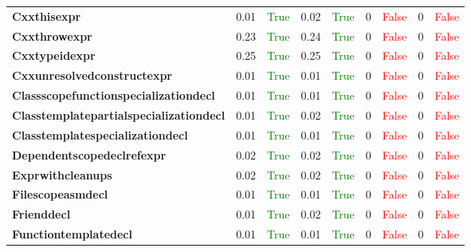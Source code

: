 \documentclass{article}
\begin{document}
\begin{xltabular}{\textwidth}{lcccccccc}
\textbf{{\fontsize{10}{12}\selectfont Cxxthisexpr}}& 0.01&\textcolor{green}{True}& 0.02&\textcolor{green}{True}& 0&\textcolor{red}{False}& 0&\textcolor{red}{False} \\[0.5ex]
\textbf{{\fontsize{10}{12}\selectfont Cxxthrowexpr}}& 0.23&\textcolor{green}{True}& 0.24&\textcolor{green}{True}& 0&\textcolor{red}{False}& 0&\textcolor{red}{False} \\[0.5ex]
\textbf{{\fontsize{10}{12}\selectfont Cxxtypeidexpr}}& 0.25&\textcolor{green}{True}& 0.25&\textcolor{green}{True}& 0&\textcolor{red}{False}& 0&\textcolor{red}{False} \\[0.5ex]
\textbf{{\fontsize{10}{12}\selectfont Cxxunresolvedconstructexpr}}& 0.01&\textcolor{green}{True}& 0.01&\textcolor{green}{True}& 0&\textcolor{red}{False}& 0&\textcolor{red}{False} \\[0.5ex]
\textbf{{\fontsize{10}{12}\selectfont Classscopefunctionspecializationdecl}}& 0.01&\textcolor{green}{True}& 0.01&\textcolor{green}{True}& 0&\textcolor{red}{False}& 0&\textcolor{red}{False} \\[0.5ex]
\textbf{{\fontsize{10}{12}\selectfont Classtemplatepartialspecializationdecl}}& 0.01&\textcolor{green}{True}& 0.02&\textcolor{green}{True}& 0&\textcolor{red}{False}& 0&\textcolor{red}{False} \\[0.5ex]
\textbf{{\fontsize{10}{12}\selectfont Classtemplatespecializationdecl}}& 0.01&\textcolor{green}{True}& 0.01&\textcolor{green}{True}& 0&\textcolor{red}{False}& 0&\textcolor{red}{False} \\[0.5ex]
\textbf{{\fontsize{10}{12}\selectfont Dependentscopedeclrefexpr}}& 0.02&\textcolor{green}{True}& 0.02&\textcolor{green}{True}& 0&\textcolor{red}{False}& 0&\textcolor{red}{False} \\[0.5ex]
\textbf{{\fontsize{10}{12}\selectfont Exprwithcleanups}}& 0.02&\textcolor{green}{True}& 0.02&\textcolor{green}{True}& 0&\textcolor{red}{False}& 0&\textcolor{red}{False} \\[0.5ex]
\textbf{{\fontsize{10}{12}\selectfont Filescopeasmdecl}}& 0.01&\textcolor{green}{True}& 0.01&\textcolor{green}{True}& 0&\textcolor{red}{False}& 0&\textcolor{red}{False} \\[0.5ex]
\textbf{{\fontsize{10}{12}\selectfont Frienddecl}}& 0.01&\textcolor{green}{True}& 0.02&\textcolor{green}{True}& 0&\textcolor{red}{False}& 0&\textcolor{red}{False} \\[0.5ex]
\textbf{{\fontsize{10}{12}\selectfont Functiontemplatedecl}}& 0.01&\textcolor{green}{True}& 0.01&\textcolor{green}{True}& 0&\textcolor{red}{False}& 0&\textcolor{red}{False} \\[0.5ex]

\end{xltabular}
\end{document}
